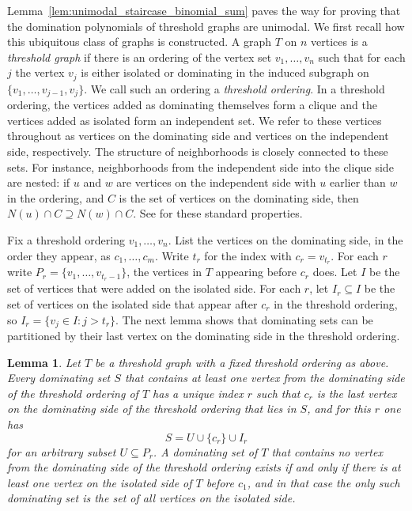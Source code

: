 \documentclass[11pt]{amsart}
\newtheorem{lemma}[theorem]{Lemma}
\numberwithin{equation}{section}
\begin{document}
Lemma~\ref{lem:unimodal_staircase_binomial_sum} paves the way for proving that the domination polynomials of threshold graphs are unimodal. We first recall how this ubiquitous class of graphs is constructed. A graph $T$ on $n$ vertices is a \emph{threshold graph} if there is an ordering of the vertex set $v_1,\dots,v_n$ such that for each $j$ the vertex $v_j$ is either isolated or dominating in the induced subgraph on $\{v_1,\dots,v_{j-1},v_j\}$. We call such an ordering a \emph{threshold ordering}. In a threshold ordering, the vertices added as dominating themselves form a clique and the vertices added as isolated form an independent set. We refer to these vertices throughout as vertices on the dominating side and vertices on the independent side, respectively. The structure of neighborhoods is closely connected to these sets. For instance, neighborhoods from the independent side into the clique side are nested: if $u$ and $w$ are vertices on the independent side with $u$ earlier than $w$ in the ordering, and $C$ is the set of vertices on the dominating side, then $N(u)\cap C\supseteq N(w)\cap C$. See \cite{MahadevPeled1995} for these standard properties.

Fix a threshold ordering $v_1,\dots,v_n$. List the vertices on the dominating side, in the order they appear, as $c_1,\dots,c_m$. Write $t_r$ for the index with $c_r=v_{t_r}$. For each $r$ write $P_r=\{v_1,\dots,v_{t_r-1}\}$, the vertices in $T$ appearing before $c_r$ does. Let $I$ be the set of vertices that were added on the isolated side. For each $r$, let $I_r\subseteq I$ be the set of vertices on the isolated side that appear after $c_r$ in the threshold ordering, so $I_r=\{v_j\in I:j>t_r\}$. The next lemma shows that dominating sets can be partitioned by their last vertex on the dominating side in the threshold ordering.

\begin{lemma}\label{lem:threshold-decomp}
Let $T$ be a threshold graph with a fixed threshold ordering as above. Every dominating set $S$ that contains at least one vertex from the dominating side of the threshold ordering of $T$ has a unique index $r$ such that $c_r$ is the last vertex on the dominating side of the threshold ordering that lies in $S$, and for this $r$ one has
\[
S=U \cup \{c_r\}\cup I_r
\]
for an arbitrary subset $U\subseteq P_r$. A dominating set of $T$ that contains no vertex from the dominating side of the threshold ordering exists if and only if there is at least one vertex on the isolated side of $T$ before $c_1$, and in that case the only such dominating set is the set of all vertices on the isolated side.
\end{lemma}
\end{document}
